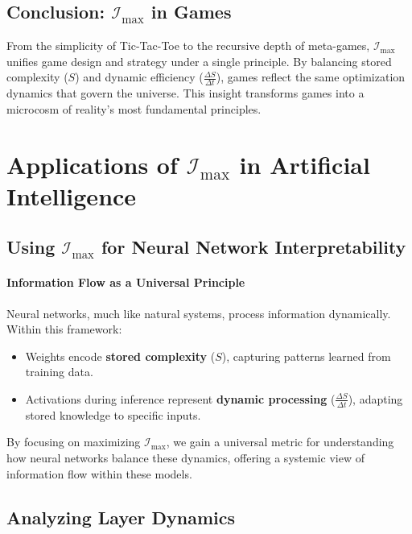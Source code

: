 \documentclass[12pt]{article}
\begin{document}
\subsection{Conclusion: \(\mathcal{I}_{\text{max}}\) in Games}
From the simplicity of Tic-Tac-Toe to the recursive depth of meta-games, \(\mathcal{I}_{\text{max}}\) unifies game design and strategy under a single principle. By balancing stored complexity (\(S\)) and dynamic efficiency (\(\frac{\Delta S}{\Delta t}\)), games reflect the same optimization dynamics that govern the universe. This insight transforms games into a microcosm of reality’s most fundamental principles.


\section{Applications of \(\mathcal{I}_{\text{max}}\) in Artificial Intelligence}

\subsection{Using \(\mathcal{I}_{\text{max}}\) for Neural Network Interpretability}

\paragraph{Information Flow as a Universal Principle}
Neural networks, much like natural systems, process information dynamically. Within this framework:
\begin{itemize}
    \item Weights encode \textbf{stored complexity} (\(S\)), capturing patterns learned from training data.
    \item Activations during inference represent \textbf{dynamic processing} (\(\frac{\Delta S}{\Delta t}\)), adapting stored knowledge to specific inputs.
\end{itemize}
By focusing on maximizing \(\mathcal{I}_{\text{max}}\), we gain a universal metric for understanding how neural networks balance these dynamics, offering a systemic view of information flow within these models.

\subsection{Analyzing Layer Dynamics}
\end{document}
